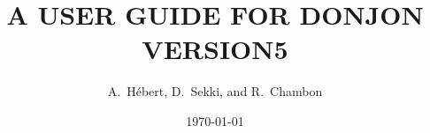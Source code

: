 \documentclass{report}
\begin{document}
\title{A USER GUIDE FOR DONJON VERSION5}

\author{A.~H\'ebert, D.~Sekki, and R.~Chambon}

\date{\today}



\clearpage
{}
\tableofcontents
\clearpage
{}
\listoftables
\clearpage
{}
\listoffigures

\Debutdutexte






\clearpage
{}

\clearpage
{}
\printindex
\end{document}
